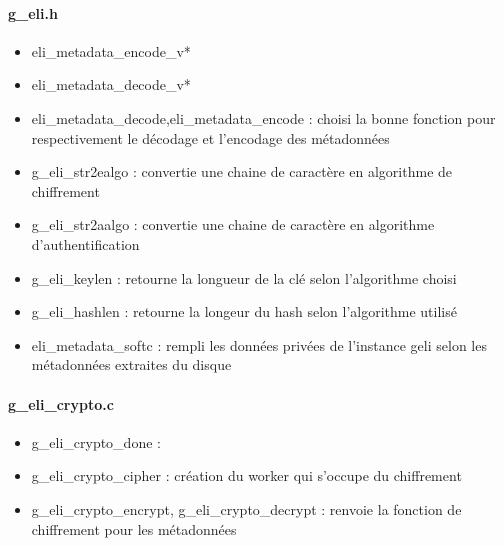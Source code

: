 \paragraph{g\_eli.h}
\begin{itemize}
	\item eli\_metadata\_encode\_v*
	\item eli\_metadata\_decode\_v*
	\item eli\_metadata\_decode,eli\_metadata\_encode : choisi la bonne fonction pour 
		respectivement le décodage et l'encodage des métadonnées
	\item g\_eli\_str2ealgo : convertie une chaine de caractère en algorithme de 
		chiffrement
	\item g\_eli\_str2aalgo : convertie une chaine de caractère en algorithme 
		d'authentification
	\item g\_eli\_keylen : retourne la longueur de la clé selon l'algorithme choisi
	\item g\_eli\_hashlen : retourne la longeur du hash selon l'algorithme utilisé
	\item eli\_metadata\_softc : rempli les données privées de l'instance geli 
		selon les métadonnées extraites du disque
\end{itemize}

\paragraph{g\_eli\_crypto.c}
\begin{itemize}
	\item g\_eli\_crypto\_done : 
	\item g\_eli\_crypto\_cipher : création du worker qui s'occupe du 
		chiffrement
	\item g\_eli\_crypto\_encrypt, g\_eli\_crypto\_decrypt : 
		renvoie la fonction de chiffrement pour les métadonnées
\end{itemize}

